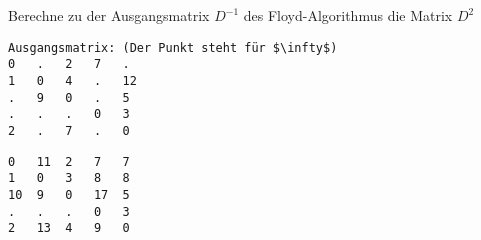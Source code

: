 ﻿\question[4]
Berechne zu der Ausgangsmatrix $D^{-1}$ des Floyd-Algorithmus
die Matrix $D^2$
\begin{lstlisting}
Ausgangsmatrix: (Der Punkt steht für $\infty$)
0   .   2   7   .
1   0   4   .   12
.   9   0   .   5
.   .   .   0   3
2   .   7   .   0
\end{lstlisting}

\begin{solutionbox}{6cm}
\begin{lstlisting}
0   11  2   7   7
1   0   3   8   8
10  9   0   17  5
.   .   .   0   3
2   13  4   9   0   
\end{lstlisting}
\end{solutionbox}
